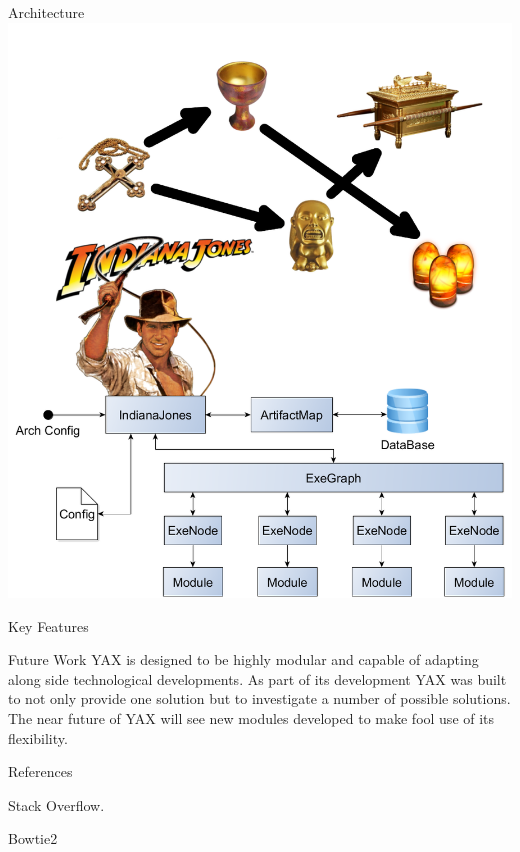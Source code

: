 \documentclass[final,t]{beamer}
\begin{document}
\begin{frame}{}
\begin{columns}[t]
    \begin{column}{.3\linewidth}
        \begin{block}{Architecture}
            \includegraphics[width=1\linewidth]{assets/arch}\newline\newline

        \end{block}
        \begin{block}{Key Features}

        \end{block}



        \begin{block}{Future Work}
            YAX is designed to be highly modular and capable of adapting along side technological developments. As part of its development
            YAX was built to not only provide one solution but to investigate a number of possible solutions. The near future of YAX will
            see new modules developed to make fool use of its flexibility.

        \end{block}
        \begin{block}{References}
            \begin{itemize}
              {\small
              \item[1]Stack Overflow.
              \item[2]Bowtie2
              }
          \end{itemize}
        \end{block}


\end{column}
\end{columns}
\end{frame}
\end{document}
